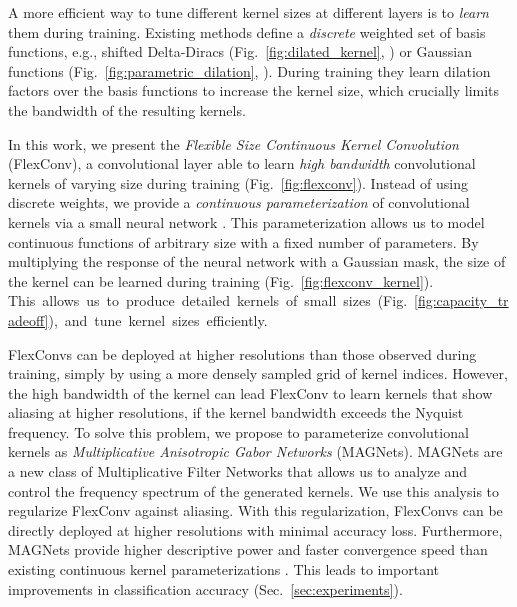 \documentclass{article} \usepackage{iclr2022_conference,times}
\begin{document}
A more efficient way to tune different kernel sizes at different layers is to \textit{learn} them during training.\break
Existing methods define a \textit{discrete} weighted set of basis functions, e.g., shifted Delta-Diracs (Fig.~\ref{fig:dilated_kernel}, \citet{dai2017deformable}) or Gaussian functions (Fig.~\ref{fig:parametric_dilation}, \citet{jacobsen2016structured, Shelhamer2019BlurringTL, pintea2021resolution}). During training they learn dilation factors over the basis functions to increase the kernel size, which crucially limits the bandwidth of the resulting kernels.


In this work, we present the \textit{Flexible Size Continuous Kernel Convolution} (FlexConv), a convolutional layer able to learn \textit{high bandwidth} convolutional kernels of varying size during training (Fig.~\ref{fig:flexconv}). Instead of using discrete weights, we provide a \textit{continuous parameterization} of convolutional kernels via a small neural network \citep{romero2021ckconv}. This parameterization allows us to model continuous functions of arbitrary size with a fixed number of parameters. By multiplying the response of the neural network with a Gaussian mask, the size of the kernel can be learned during training (Fig.~\ref{fig:flexconv_kernel}). This~allows~us~to~produce~detailed~kernels~of~small~sizes~(Fig.~\ref{fig:capacity_tradeoff}),~and~tune~kernel~sizes~efficiently.


FlexConvs can be deployed at higher resolutions than those observed during training, simply by using a more densely sampled grid of kernel indices. However, the high bandwidth of the kernel can lead FlexConv to learn kernels that show aliasing at higher resolutions, if the kernel bandwidth exceeds the Nyquist frequency. 
To solve this problem, we propose to parameterize convolutional kernels as \textit{Multiplicative Anisotropic Gabor Networks} (MAGNets). MAGNets are a new class of Multiplicative Filter Networks \citep{fathony2021multiplicative} that allows us to analyze and control the frequency spectrum of the generated kernels. We use this analysis to regularize FlexConv against aliasing. With this regularization, FlexConvs can be directly deployed at higher resolutions with minimal accuracy loss. Furthermore, MAGNets provide higher descriptive power and faster convergence speed than existing continuous kernel parameterizations \citep{schutt2017schnet, finzi2020generalizing, romero2021ckconv}. This leads to important improvements in classification accuracy (Sec.~\ref{sec:experiments}).
\end{document}
